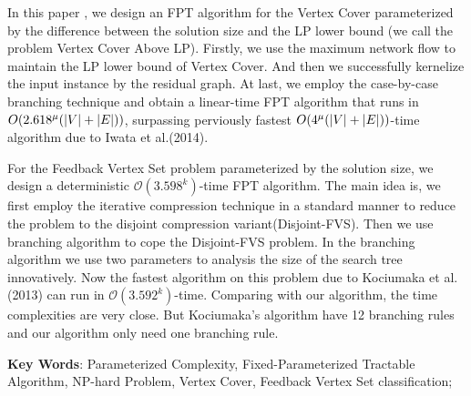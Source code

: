 In this paper , we design an FPT algorithm for the Vertex Cover parameterized by the difference between the solution size and the LP lower bound
(we call the problem Vertex Cover Above LP).
Firstly, we use the maximum network flow to maintain the LP lower bound of Vertex Cover.
And then we successfully kernelize the input instance by the residual graph.
At last, we employ the case-by-case branching technique and obtain a linear-time FPT algorithm that runs in $O(2.618^\mu(\left\vert V \right\vert + \left\vert E \right\vert))$,
surpassing perviously fastest $O(4^\mu(\left\vert V \right\vert + \left\vert E \right\vert))$-time algorithm due to Iwata et al.(2014).

For the Feedback Vertex Set problem parameterized by the solution size, we design a deterministic $\mathcal{O}(3.598^k)$-time FPT algorithm.
The main idea is, we first employ the iterative compression technique in a standard manner to reduce the problem to the disjoint compression variant(Disjoint-FVS).
Then we use branching algorithm to cope the Disjoint-FVS problem.
In the branching algorithm we use two parameters to analysis the size of the search tree innovatively.
Now the fastest algorithm on this problem due to Kociumaka et al.(2013) can run in $\mathcal{O}(3.592^k)$-time.
Comparing with our algorithm, the time complexities are very close.
But Kociumaka's algorithm have 12 branching rules and our algorithm only need one branching rule.


\vspace{1cm} \noindent\textbf{Key Words}: Parameterized Complexity, Fixed-Parameterized Tractable Algorithm, NP-hard Problem, Vertex Cover, Feedback Vertex Set
classification;

\restoregeometry